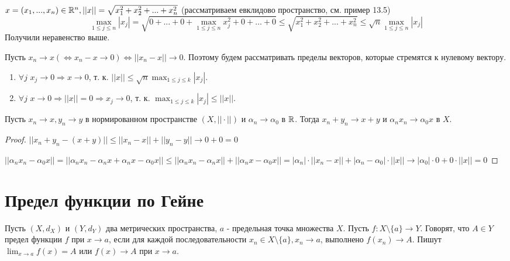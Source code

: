     \begin{explanation}
    	$x = (x_1, ..., x_n) \in \mathbb R^n, ||x|| = \sqrt{x_1^2 + x_2^2 + ... + x_n^2}$ (рассматриваем евклидово пространство, см. пример 13.5)
    	\[ \max_{1 \leqslant j \leqslant n} |x_j| = \sqrt{0 + ... + 0 + \max_{1 \leqslant j \leqslant n} x_j^2 + 0 + ... + 0} \leqslant \sqrt{x_1^2 + x_2^2 + ... + x_n^2} \leqslant \sqrt{n} \max_{1 \leqslant j \leqslant n} |x_j| \]
    	Получили неравенство выше.
    
    	Пусть $x_n \to x (\Leftrightarrow x_n - x \to 0) \Leftrightarrow ||x_n - x|| \to 0$. Поэтому будем рассматривать пределы векторов, которые стремятся к нулевому вектору.
    	\begin{enumerate}
    		\item $\forall j$ $x_j \to 0 \Rightarrow x \to 0$, т. к. $||x|| \leqslant \sqrt{n} \max_{1 \leqslant j \leqslant k} |x_j|$.
    		\item $\forall j$ $x \to 0 \Rightarrow ||x|| = 0 \Rightarrow x_j \to 0$, т. к. $\max_{1 \leqslant j \leqslant k} |x_j| \leqslant ||x||$.
    	\end{enumerate}
    \end{explanation}
    
    \begin{sentence}
    	Пусть $x_n \rightarrow x, y_n \rightarrow y$ в нормированном пространстве $(X, ||\cdot||)$ и $\alpha_n \rightarrow \alpha_0$ в $\mathbb R$. Тогда $x_n + y_n \rightarrow x + y$ и $\alpha_n x_n \rightarrow \alpha_0 x$ в $X$.
    \end{sentence}
    
    \begin{proof}
    	$||x_n + y_n - (x + y)|| \leqslant ||x_n - x|| + ||y_n - y|| \to 0 + 0 = 0$
    	
    	$||\alpha_n x_n - \alpha_0 x|| = ||\alpha_n x_n - \alpha_n x + \alpha_n x - \alpha_0 x|| \leqslant ||\alpha_n x_n - \alpha_n x|| + ||\alpha_n x - \alpha_0 x|| = |\alpha_n| \cdot ||x_n - x|| + |\alpha_n - \alpha_0| \cdot ||x|| \to |\alpha_0| \cdot 0 + 0 \cdot ||x|| = 0$
    \end{proof}
    
    
    \section{Предел функции по Гейне}
    
    \begin{definition}
    	Пусть $(X, d_X)$ и $(Y, d_Y)$ два метрических пространства, $a$ - предельная точка множества $X$. Пусть $f : X \setminus \{a\} \rightarrow Y$. Говорят, что $A \in Y$ предел функции $f$ при $x \rightarrow a$, если для каждой  последовательности $x_n \in X \setminus \{a\}, x_n \rightarrow a$, выполнено $f(x_n) \rightarrow A$. Пишут $\displaystyle \lim_{x \rightarrow a} f(x) = A$ или $f(x) \rightarrow A$ при $x \rightarrow a$.
    \end{definition}
    
